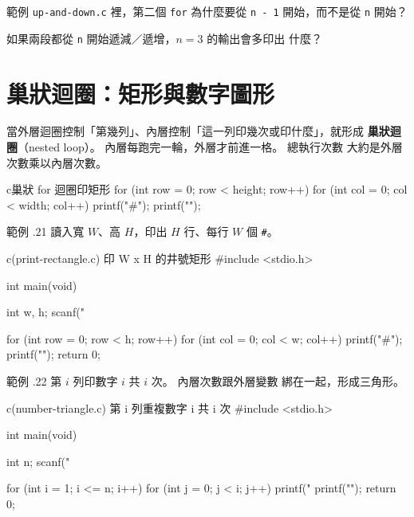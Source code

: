 \begin{drills}[label=drills:loop-two-stage]
\item 範例 \texttt{up-and-down.c} 裡，第二個 \texttt{for} 為什麼要從
\texttt{n - 1} 開始，而不是從 \texttt{n} 開始？
\item 如果兩段都從 \texttt{n} 開始遞減／遞增，$n = 3$ 的輸出會多印出
什麼？
\end{drills}

\section{巢狀迴圈：矩形與數字圖形}
\label{sec:loop-nested-shapes}

當外層迴圈控制「第幾列」、內層控制「這一列印幾次或印什麼」，就形成\textbf{
巢狀迴圈}（nested loop）。 內層每跑完一輪，外層才前進一格。 總執行次數
大約是外層次數乘以內層次數。

\begin{code}{c}{巢狀 for 迴圈印矩形}
for (int row = 0; row < height; row++) {
    for (int col = 0; col < width; col++) {
        printf("#");
    }
    printf("\n");
}
\end{code}

範例 \thechapter.21 讀入寬 $W$、高 $H$，印出 $H$ 行、每行 $W$ 個
\texttt{\#}。

\begin{example}{c}{(print-rectangle.c) 印 W x H 的井號矩形}
#include <stdio.h>

int main(void) {
    int w, h;
    scanf("%

    for (int row = 0; row < h; row++) {
        for (int col = 0; col < w; col++) {
            printf("#");
        }
        printf("\n");
    }
    return 0;
}
\end{example}


範例 \thechapter.22 第 $i$ 列印數字 $i$ 共 $i$ 次。 內層次數跟外層變數
綁在一起，形成三角形。

\begin{example}{c}{(number-triangle.c) 第 i 列重複數字 i 共 i 次}
#include <stdio.h>

int main(void) {
    int n;
    scanf("%

    for (int i = 1; i <= n; i++) {
        for (int j = 0; j < i; j++) {
            printf("%
        }
        printf("\n");
    }
    return 0;
}
\end{example}

